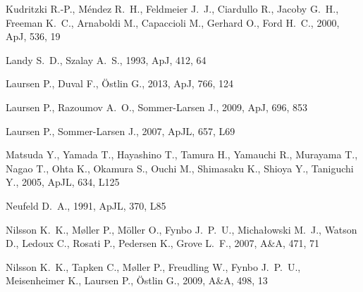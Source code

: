 \documentclass[usenatbib]{mn2e}
\newcommand{\apj}{ApJ}
\newcommand{\apjl}{ApJL}
\newcommand{\aap}{A\&A}
\begin{document}
{\begin{thebibliography}{}
{Kudritzki} R.-P.,  {M{\'e}ndez} R.~H.,  {Feldmeier} J.~J.,  {Ciardullo} R.,
  {Jacoby} G.~H.,  {Freeman} K.~C.,  {Arnaboldi} M.,  {Capaccioli} M.,
  {Gerhard} O.,    {Ford} H.~C.,  2000, \apj, 536, 19

{Landy} S.~D.,  {Szalay} A.~S.,  1993, \apj, 412, 64

{Laursen} P.,  {Duval} F.,    {{\"O}stlin} G.,  2013, \apj, 766, 124

{Laursen} P.,  {Razoumov} A.~O.,    {Sommer-Larsen} J.,  2009, \apj, 696, 853

{Laursen} P.,  {Sommer-Larsen} J.,  2007, \apjl, 657, L69

{Matsuda} Y.,  {Yamada} T.,  {Hayashino} T.,  {Tamura} H.,  {Yamauchi} R.,
  {Murayama} T.,  {Nagao} T.,  {Ohta} K.,  {Okamura} S.,  {Ouchi} M.,
  {Shimasaku} K.,  {Shioya} Y.,    {Taniguchi} Y.,  2005, \apjl, 634, L125

{Neufeld} D.~A.,  1991, \apjl, 370, L85

{Nilsson} K.~K.,  {M{\o}ller} P.,  {M{\"o}ller} O.,  {Fynbo} J.~P.~U.,
  {Micha{\l}owski} M.~J.,  {Watson} D.,  {Ledoux} C.,  {Rosati} P.,  {Pedersen}
  K.,    {Grove} L.~F.,  2007, \aap, 471, 71

{Nilsson} K.~K.,  {Tapken} C.,  {M{\o}ller} P.,  {Freudling} W.,  {Fynbo}
  J.~P.~U.,  {Meisenheimer} K.,  {Laursen} P.,    {{\"O}stlin} G.,  2009, \aap,
  498, 13


\end{thebibliography}}
\end{document}
